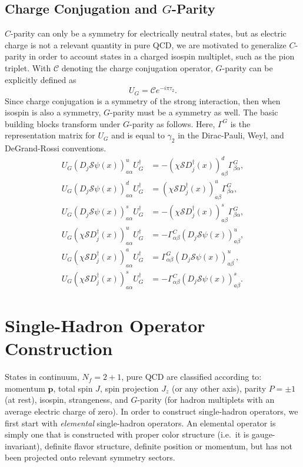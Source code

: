     \subsection{Charge Conjugation and $G$-Parity}
    $C$-parity can only be a symmetry for electrically neutral states, but as electric charge is not a relevant quantity in pure QCD, we are motivated to generalize $C$-parity in order to account states in a charged isospin multiplet, such as the pion triplet. With $\mathcal C$ denoting the charge conjugation operator, $G$-parity can be explicitly defined as
    \begin{equation}
        U_G = \mathcal C e^{-i\pi\tau_2}.
    \end{equation}
    Since charge conjugation is a symmetry of the strong interaction, then when isospin is also a symmetry, $G$-parity must be a symmetry as well. The basic building blocks transform under $G$-parity as follows. Here, $\Gamma^G$ is the representation matrix for $U_G$ and is equal to $\gamma_2$ in the Dirac-Pauli, Weyl, and DeGrand-Rossi conventions.
    \begin{align} U_{G}\left(D_{j} \mathcal S \psi(x)\right)_{a \alpha}^{u} U_{G}^{\dagger} &=-\left(\chi \mathcal S D_{j}^{\dagger}(x)\right)_{a \beta}^{d} \Gamma_{\beta \alpha}^{G}, \\ U_{G}\left(D_{j}\mathcal S \psi(x)\right)_{a \alpha}^{d} U_{G}^{\dagger} &=\left(\chi \mathcal S D_{j}^{\dagger}(x)\right)_{a \beta}^{u} \Gamma_{\beta \alpha}^{G}, \\ U_{G}\left(D_{j} \mathcal S \psi(x)\right)_{a \alpha}^{s} U_{G}^{\dagger} &=-\left(\chi \mathcal S D_{j}^{\dagger}(x)\right)_{a \beta}^{s} \Gamma_{\beta \alpha}^{G}, \\ U_{G}\left(\chi \mathcal S D_{j}^{\dagger}(x)\right)_{a \alpha}^{u} U_{G}^{\dagger} &=-\Gamma_{\alpha \beta}^{C}\left(D_{j} \mathcal S \psi(x)\right)_{a \beta}^{u}, \\ U_{G}\left(\chi \mathcal S D_{j}^{\dagger}(x)\right)_{a \alpha}^{a} U_{G}^{\dagger} &=\Gamma_{\alpha \beta}^{G}\left(D_{j} \mathcal S \psi(x)\right)_{a \beta^{\prime}}^{u}, \\ U_{G}\left(\chi \mathcal S D_{j}^{\dagger}(x)\right)_{a \alpha}^{s} U_{G}^{\dagger} &=-\Gamma_{\alpha \beta}^{C}\left(D_{j} \mathcal S \psi(x)\right)_{a \beta}^{s}. \end{align}
    \section{Single-Hadron Operator Construction}
    States in continuum, $N_f=2+1$, pure QCD are classified according to: momentum $\boldsymbol p$, total spin $J$, spin projection $J_z$ (or any other axis), parity $P = \pm 1$ (at rest), isospin, strangeness, and $G$-parity (for hadron multiplets with an average electric charge of zero). In order to construct single-hadron operators, we first start with \emph{elemental} single-hadron operators. An elemental operator is simply one that is constructed with proper color structure (i.e.\ it is gauge-invariant), definite flavor structure, definite position or momentum, but has not been projected onto relevant symmetry sectors.
